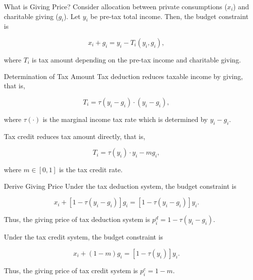 \documentclass[
  ignorenonframetext,
]{beamer}
\begin{document}
\begin{frame}{What is Giving Price?}
\protect\hypertarget{what-is-giving-price}{}
Consider allocation between private consumptions (\(x_i\)) and charitable giving (\(g_i\)).
Let \(y_i\) be pre-tax total income.
Then, the budget constraint is

\[
    x_i + g_i = y_i - T_i(y_i, g_i),
\]

where \(T_i\) is tax amount depending on the pre-tax income and charitable giving.
\end{frame}

\begin{frame}{Determination of Tax Amount}
\protect\hypertarget{determination-of-tax-amount}{}
Tax deduction reduces taxable income by giving, that is,

\[
    T_i = \tau(y_i - g_i) \cdot (y_i - g_i),
\]

where \(\tau(\cdot)\) is the marginal income tax rate which is determined by \(y_i - g_i\).

Tax credit reduces tax amount directly, that is,

\[
    T_i = \tau(y_i)\cdot y_i - m g_i,
\]

where \(m \in [0, 1]\) is the tax credit rate.
\end{frame}

\begin{frame}{Derive Giving Price}
\protect\hypertarget{derive-giving-price}{}
Under the tax deduction system, the budget constraint is

\[
    x_i + [1 - \tau(y_i - g_i)]g_i = [1 - \tau(y_i - g_i)] y_i.
\]

Thus, the giving price of tax deduction system is \(p_i^{d} = 1 - \tau(y_i - g_i)\).

Under the tax credit system, the budget constraint is

\[
    x_i + (1 - m) g_i = [1 - \tau(y_i)] y_i.
\]

Thus, the giving price of tax credit system is \(p_i^c = 1 - m\).
\end{frame}
\end{document}
